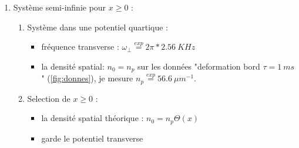 \documentclass[a3, 10pt,twoside]{article}          %
\theoremstyle{plain}
\theoremstyle{definition}
\theoremstyle{remark}
\theoremstyle{definition} %
\begin{document}
  \hfill %
	\begin{minipage}[b]{0.45\textwidth}
			
	\begin{enumerate}[label =\Alph*)]

		\item Système semi-infinie pour $x\geq 0$ :
			\begin{enumerate}[label =\alph*)]
				\item Système dans une potentiel quartique  :
					\begin{itemize}[label =$\bullet$]
						\item fréquence transverse : $\omega_\perp \overset{exp}{=} 2 \pi * 2.56 ~KHz$	
						\item la densité spatial: $n_0 = n_p $  sur les données {\color{blue} "deformation bord $\tau = 1~ ms$" (\ref{fig:donnes}), je mesure   $n_p \overset{exp}{=} 56.6 ~{\mu m}^{-1}$.}
					\end{itemize}
				\item Selection de $x\geq 0$  :
					\begin{itemize}[label =$\bullet$]
						\item la densité spatial théorique : $n_0 = n_p \Theta (x) $  
						\item garde le potentiel transverse
					\end{itemize}

			\end{enumerate}
			

\end{enumerate}
\end{minipage}
\end{document}
